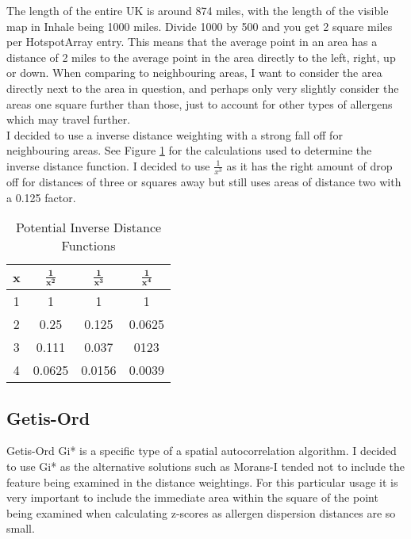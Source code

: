 The length of the entire UK is around 874 miles, with the length of the visible map in Inhale being 1000 miles. Divide 1000 by 500 and you get 2 square miles per HotspotArray entry. This means that the average point in an area has a distance of 2 miles to the average point in the area directly to the left, right, up or down. When comparing to neighbouring areas, I want to consider the area directly next to the area in question, and perhaps only very slightly consider the areas one square further than those, just to account for other types of allergens which may travel further.\\

I decided to use a inverse distance weighting with a strong fall off for neighbouring areas. See Figure \ref{table:dist} for the calculations used to determine the inverse distance function. I decided to use $\frac{1}{x^3}$ as it has the right amount of drop off for distances of three or squares away but still uses areas of distance two with a 0.125 factor.\\ 

\begin{table}[H]
\begin{center}
\begin{tabular}{|c|c|c|c|}\hline\hline
x&$\mathbf{\frac{1}{x^2}}$&$\mathbf{\frac{1}{x^3}}$&$\mathbf{\frac{1}{x^4}}$\\\hline
1&1&1&1\\
2&0.25&0.125&0.0625\\
3&0.111&0.037&0123\\
4&0.0625&0.0156&0.0039\\\hline\hline
\end{tabular}
\caption{Potential Inverse Distance Functions}
\label{table:dist}
\end{center}
\end{table}


\subsection{Getis-Ord}

Getis-Ord Gi* is a specific type of a spatial autocorrelation algorithm. I decided to use Gi* as the alternative solutions such as Morans-I tended not to include the feature being examined in the distance weightings. For this particular usage it is very important to include the immediate area within the square of the point being examined when calculating z-scores as allergen dispersion distances are so small.

